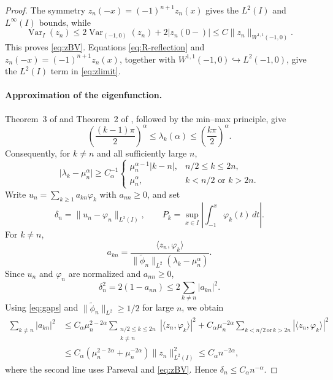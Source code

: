 \documentclass[11pt]{amsart}
\numberwithin{equation}{section}
\theoremstyle{remark}
\newcommand{\wt}{\widetilde}
\newcommand{\norm}[2][]{\lVert #2\rVert_{#1}}
\newcommand{\abs}[1]{\lvert #1\rvert}
\newcommand{\ip}[2]{\langle #1,#2\rangle}
\newcommand{\Var}{\operatorname{Var}}
\begin{document}
\begin{proof}
The symmetry $z_n(-x)=(-1)^{n+1}z_n(x)$ gives the $L^2(I)$ and
$L^\infty(I)$ bounds, while
\[
 \Var_I(z_n)\le2\Var_{(-1,0)}(z_n)+2|z_n(0-)|
 \le C\norm[W^{1,1}(-1,0)]{z_n}.
\]
This proves \eqref{eq:zBV}.  Equations \eqref{eq:R-reflection} and
$z_n(-x)=(-1)^{n+1}z_n(x)$, together with
$W^{1,1}(-1,0)\hookrightarrow L^2(-1,0)$, give the $L^2(I)$ term in
\eqref{eq:zlimit}.

\medskip

\paragraph{\textbf{Approximation of the eigenfunction.}}
Theorem~3 of \cite{NazarovComparison} and Theorem~2 of
\cite{MusinaNazarov}, followed by the min--max principle, give
\begin{equation}\label{eq:sandwich}
 \left(\frac{(k-1)\pi}{2}\right)^\alpha
 \le\lambda_k(\alpha)\le
 \left(\frac{k\pi}{2}\right)^\alpha.
\end{equation}
Consequently, for $k\ne n$ and all sufficiently large $n$,
\begin{equation}\label{eq:gaps}
 \abs{\lambda_k-\mu_n^\alpha}\ge C_\alpha^{-1}
 \begin{cases}
  \mu_n^{\alpha-1}\abs{k-n},&n/2\le k\le2n,\\
  \mu_n^\alpha,&k<n/2\text{ or }k>2n.
 \end{cases}
\end{equation}
Write $u_n=\sum_{k\ge1}a_{kn}\varphi_k$ with $a_{nn}\ge0$, and set
\[
 \delta_n=\norm[L^2(I)]{u_n-\varphi_n},
 \qquad
 P_k=\sup_{x\in I}\left|\int_{-1}^x\varphi_k(t)\,dt\right|.
\]
For $k\ne n$,
\[
 a_{kn}=\frac{\ip{z_n}{\varphi_k}}
 {\norm[L^2]{\wt\phi_n}(\lambda_k-\mu_n^\alpha)}.
\]
Since $u_n$ and $\varphi_n$ are normalized and $a_{nn}\ge0$,
\[
 \delta_n^2=2(1-a_{nn})\le2\sum_{k\ne n}|a_{kn}|^2.
\]
Using \eqref{eq:gaps} and
$\norm[L^2]{\wt\phi_n}\ge1/2$ for large $n$, we obtain
\begin{align*}
 \sum_{k\ne n}|a_{kn}|^2
 &\le C_\alpha\mu_n^{2-2\alpha}
   \sum_{\substack{n/2\le k\le2n\\k\ne n}}
   |\ip{z_n}{\varphi_k}|^2
 +C_\alpha\mu_n^{-2\alpha}
   \sum_{k<n/2\,\text{or}\,k>2n}|\ip{z_n}{\varphi_k}|^2\\
 &\le C_\alpha\left(\mu_n^{2-2\alpha}+\mu_n^{-2\alpha}\right)
 \norm[L^2(I)]{z_n}^2
 \le C_\alpha n^{-2\alpha},
\end{align*}
where the second line uses Parseval and \eqref{eq:zBV}.  Hence
$\delta_n\le C_\alpha n^{-\alpha}$.


\end{proof}
\end{document}
